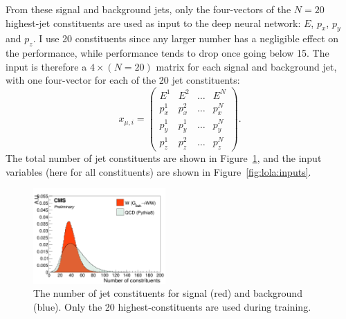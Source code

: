 From these signal and background jets, only the four-vectors of the $N=20$ highest-\PT jet constituents are used as input to the deep neural network: $E$, $p_x$, $p_y$ and $p_z$. I use 20 constituents since any larger number has a negligible effect on the performance, while performance tends to drop once going below 15. The input is therefore a $4 \times (N=20)$ matrix for each signal and background jet, with one four-vector for each of the 20 jet constituents:
\begin{equation}
x_{\mu,i}=\begin{pmatrix}
E^1 & E^2 & \dots & E^N \\[1ex]
p_x^1 & p_x^2 & \dots & p_x^N \\[1ex]
p_y^1 & p_y^1 & \dots & p_y^N \\[1ex]
p_z^1 & p_z^2 & \dots & p_z^N
\end{pmatrix}.
\end{equation}
The total number of jet constituents are shown in Figure~\ref{fig:lola:nconst}, and the input variables (here for all constituents) are shown in Figure~\ref{fig:lola:inputs}.
\begin{figure}[h!]
\centering
\includegraphics[width=0.45\textwidth]{figures/vtagging/AN-18-099/input/inputs/sig-bkg/nconst.png}
\caption{The number of jet constituents for signal (red) and background (blue). Only the 20 highest-\PT constituents are used during training.}
\label{fig:lola:nconst}
\end{figure}
